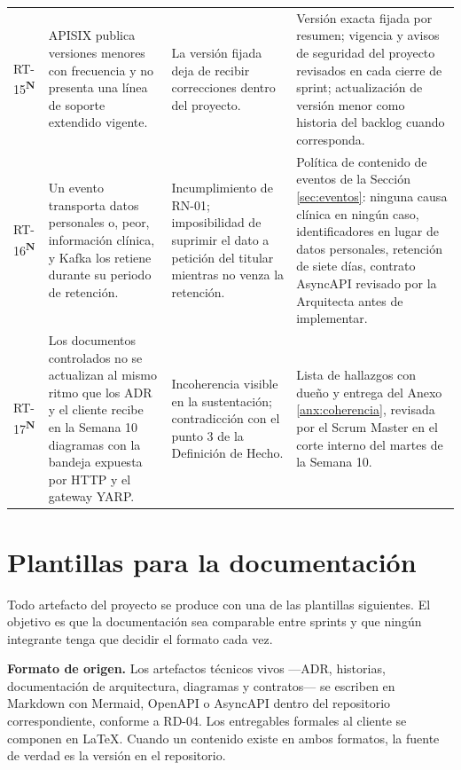 \documentclass[11pt,a4paper]{article}
\newcommand{\nueva}{\textsuperscript{\textcolor{vinotinto}{\scriptsize\bfseries N}}}
\begin{document}
\begin{longtable}{L{1.1cm} L{4.0cm} L{3.5cm} L{5.0cm}}
RT-15\nueva & APISIX publica versiones menores con frecuencia y no presenta una línea de soporte extendido vigente. & La versión fijada deja de recibir correcciones dentro del proyecto. & Versión exacta fijada por resumen; vigencia y avisos de seguridad del proyecto revisados en cada cierre de sprint; actualización de versión menor como historia del backlog cuando corresponda. \\
RT-16\nueva & Un evento transporta datos personales o, peor, información clínica, y Kafka los retiene durante su periodo de retención. & Incumplimiento de RN-01; imposibilidad de suprimir el dato a petición del titular mientras no venza la retención. & Política de contenido de eventos de la Sección \ref{sec:eventos}: ninguna causa clínica en ningún caso, identificadores en lugar de datos personales, retención de siete días, contrato AsyncAPI revisado por la Arquitecta antes de implementar. \\
RT-17\nueva & Los documentos controlados no se actualizan al mismo ritmo que los ADR y el cliente recibe en la Semana 10 diagramas con la bandeja expuesta por HTTP y el gateway YARP. & Incoherencia visible en la sustentación; contradicción con el punto 3 de la Definición de Hecho. & Lista de hallazgos con dueño y entrega del Anexo \ref{anx:coherencia}, revisada por el Scrum Master en el corte interno del martes de la Semana 10. \\
\end{longtable}

\section{Plantillas para la documentación}
\label{sec:plantillas}

Todo artefacto del proyecto se produce con una de las plantillas siguientes. El objetivo es que la documentación sea comparable entre sprints y que ningún integrante tenga que decidir el formato cada vez.

\vspace{0.2cm}
\noindent\textbf{Formato de origen.} Los artefactos técnicos vivos ---ADR, historias, documentación de arquitectura, diagramas y contratos--- se escriben en Markdown con Mermaid, OpenAPI o AsyncAPI dentro del repositorio correspondiente, conforme a RD-04. Los entregables formales al cliente se componen en \LaTeX{}. Cuando un contenido existe en ambos formatos, la fuente de verdad es la versión en el repositorio.
\end{document}
